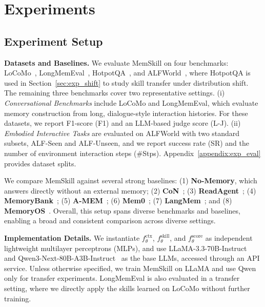 \section{Experiments}
\label{sec:exp}





\subsection{Experiment Setup}
\label{sec:exp_setup}



\textbf{Datasets and Baselines.}
We evaluate MemSkill on four benchmarks: LoCoMo~\citep{maharana2024evaluating-locomo}, LongMemEval~\citep{wu2024longmemeval}, HotpotQA~\cite{yang2018hotpotqa}, and ALFWorld~\cite{shridhar2020alfworld}, where HotpotQA is used in Section~\ref{sec:exp_shift} to study skill transfer under distribution shift. The remaining three benchmarks cover two representative settings. 
(i) \textit{Conversational Benchmarks} include LoCoMo and LongMemEval, which evaluate memory construction from long, dialogue-style interaction histories. 
For these datasets, we report F1-score (F1) and an LLM-based judge score (L-J).
(ii) \textit{Embodied Interactive Tasks} are evaluated on ALFWorld with two standard subsets, ALF-Seen and ALF-Unseen, and we report success rate (SR) and the number of environment interaction steps (\#Stps).
Appendix~\ref{appendix:exp_eval} provides dataset splits.



We compare MemSkill against several strong baselines: (1) \textbf{No-Memory}, which answers directly without an external memory; (2) \textbf{CoN}~\citep{yu2024chain}; (3) \textbf{ReadAgent}~\citep{lee2024human}; (4) \textbf{MemoryBank}~\citep{zhong2024memorybank}; (5) \textbf{A-MEM}~\citep{xu2025mem}; (6) \textbf{Mem0}~\citep{chhikara2025mem0}; (7) \textbf{LangMem}~\citep{LangMem}; and (8) \textbf{MemoryOS}~\citep{kang2025memory}.
Overall, this setup spans diverse benchmarks and baselines, enabling a broad and consistent comparison across diverse settings.






\textbf{Implementation Details.}
We instantiate $f_{\theta}^{\mathrm{ctx}}$, $f_{\theta}^{\mathrm{skill}}$, and $f_{\theta}^{\mathrm{score}}$ as independent lightweight multilayer perceptrons (MLPs), and use LLaMA-3.3-70B-Instruct~\citep{grattafiori2024llama} and Qwen3-Next-80B-A3B-Instruct~\citep{yang2025qwen3} as the base LLMs, accessed through an API service. Unless otherwise specified, we train MemSkill on LLaMA and use Qwen only for transfer experiments. LongMemEval is also evaluated in a transfer setting, where we directly apply the skills learned on LoCoMo without further training.


